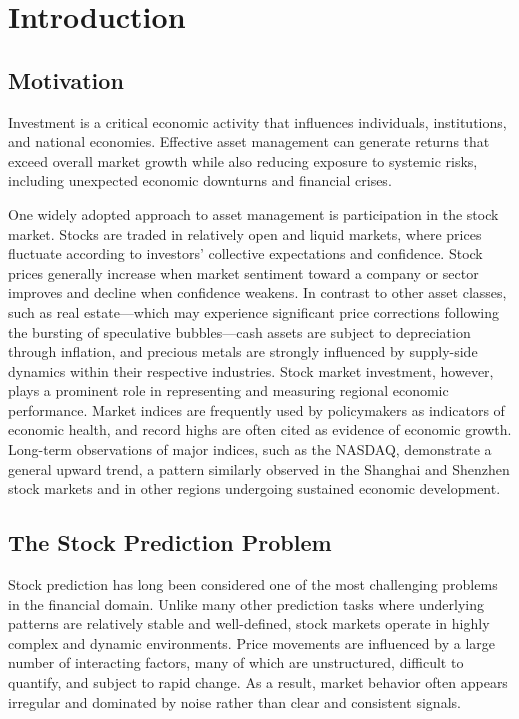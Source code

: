 \chapter{Introduction}

\section{Motivation}

Investment is a critical economic activity that influences individuals, institutions, and national economies. Effective asset management can generate returns that exceed overall market growth while also reducing exposure to systemic risks, including unexpected economic downturns and financial crises.

One widely adopted approach to asset management is participation in the stock market. Stocks are traded in relatively open and liquid markets, where prices fluctuate according to investors’ collective expectations and confidence. Stock prices generally increase when market sentiment toward a company or sector improves and decline when confidence weakens. In contrast to other asset classes, such as real estate—which may experience significant price corrections following the bursting of speculative bubbles—cash assets are subject to depreciation through inflation, and precious metals are strongly influenced by supply-side dynamics within their respective industries. Stock market investment, however, plays a prominent role in representing and measuring regional economic performance. Market indices are frequently used by policymakers as indicators of economic health, and record highs are often cited as evidence of economic growth. Long-term observations of major indices, such as the NASDAQ, demonstrate a general upward trend, a pattern similarly observed in the Shanghai and Shenzhen stock markets and in other regions undergoing sustained economic development.

\section{The Stock Prediction Problem}

Stock prediction has long been considered one of the most challenging problems in the financial domain. Unlike many other prediction tasks where underlying patterns are relatively stable and well-defined, stock markets operate in highly complex and dynamic environments. Price movements are influenced by a large number of interacting factors, many of which are unstructured, difficult to quantify, and subject to rapid change. As a result, market behavior often appears irregular and dominated by noise rather than clear and consistent signals.


